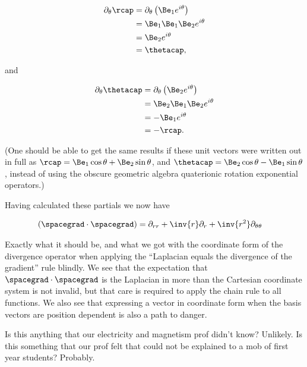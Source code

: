 \begin{align*}
\partial_\theta \rcap 
&=
\partial_\theta \left( \Be_1 e^{i\theta} \right) \\
&=
\Be_1 \Be_1 \Be_2 e^{i\theta} \\
&=
\Be_2 e^{i\theta} \\
&=
\thetacap,
\end{align*}

and

\begin{align*}
\partial_\theta \thetacap 
&=
\partial_\theta \left( \Be_2 e^{i\theta} \right) \\
&=
\Be_2 \Be_1 \Be_2 e^{i\theta} \\
&=
-\Be_1 e^{i\theta} \\
&=
-\rcap.
\end{align*}

(One should be able to get the same results if these unit vectors were written out in full as $\rcap = \Be_1 \cos\theta + \Be_2 \sin\theta$, and $\thetacap = \Be_2 \cos\theta - \Be_1 \sin\theta$, instead of using the obscure geometric algebra quaterionic rotation exponential operators.)

Having calculated these partials we now have

\begin{align}\label{eqn:divGradCurLap:14}
(\spacegrad \cdot \spacegrad) 
&=
\partial_{rr} 
+\inv{r} \partial_r 
+\inv{r^2} \partial_{\theta\theta} 
\end{align}

Exactly what it should be, and what we got with the coordinate form of the divergence operator when applying the ``Laplacian equals the divergence of the gradient'' rule blindly.  We see that the expectation that $\spacegrad \cdot \spacegrad$ is the Laplacian in more than the Cartesian coordinate system is not invalid, but that care is required to apply the chain rule to all functions.  We also see that expressing a vector in coordinate form when the basis vectors are position dependent is also a path to danger.

Is this anything that our electricity and magnetism prof didn't know?  Unlikely.  Is this something that our prof felt that could not be explained to a mob of first year students?  Probably.

\EndArticle
